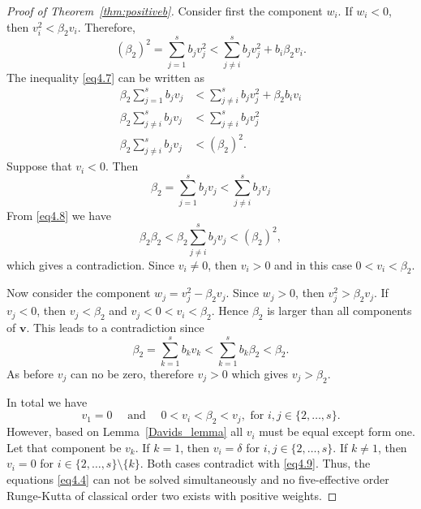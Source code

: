 \begin{proof}[Proof of Theorem~\ref{thm:positiveb}]
    Consider first the component \( w_{i} \). If \( w_{i} < 0 \), then \( v_{i}^{2} < \beta_{2}v_{i} \). Therefore,
    \begin{equation}\label{eq4.7}
        (\beta_{2})^{2} = \sum_{j=1}^{s}b_{j}v_{j}^{2} < \sum_{j \neq i}^{s}b_{j}v_{j}^{2} + b_{i}\beta_{2}v_{i}.
    \end{equation}
    The inequality \eqref{eq4.7} can be written as
    \begin{equation}\label{eq4.8}
        \begin{split}
            \beta_{2}\sum_{j=1}^{s}b_{j}v_{j} &< \sum_{j \neq i}^{s}b_{j}v_{j}^{2} + \beta_{2}b_{i}v_{i} \\
            \beta_{2}\sum_{j \neq i}^{s}b_{j}v_{j} &< \sum_{j \neq i}^{s}b_{j}v_{j}^{2} \\
            \beta_{2}\sum_{j \neq i}^{s}b_{j}v_{j} &< (\beta_{2})^{2}.
        \end{split}
    \end{equation}
    Suppose that \( v_{i} < 0 \). Then
    \begin{equation*}
        \beta_{2} = \sum_{j=1}^{s}b_{j}v_{j} < \sum_{j \neq i}^{s}b_{j}v_{j}
    \end{equation*}
    From \eqref{eq4.8} we have
    \begin{equation*}
            \beta_{2}\beta_{2} < \beta_{2}\sum_{j \neq i}^{s}b_{j}v_{j} < (\beta_{2})^{2},
    \end{equation*}
    which gives a contradiction. Since \( v_{i} \neq 0 \), then \( v_{i} > 0 \) and in this case \( 0 < v_{i} < \beta_{2} \).

    Now consider the component \( w_{j} = v_{j}^{2} - \beta_{2}v_{j} \). Since \( w_{j} > 0 \), then \( v_{j}^{2} > \beta_{2}v_{j} \). If \( v_{j} < 0 \), then \( v_{j} < \beta_{2} \) and \( v_{j} < 0 < v_{i} < \beta_{2} \). Hence \( \beta_{2} \) is larger than all components of \( \bm{v} \). This leads to a contradiction since
    \begin{equation*}
            \beta_{2} = \sum_{k=1}^{s}b_{k}v_{k} < \sum_{k=1}^{s}b_{k}\beta_{2} < \beta_{2}.
    \end{equation*}
    As before \( v_{j} \) can no be zero, therefore \( v_{j} > 0 \) which gives \( v_{j} > \beta_{2} \).

    In total we have
    \begin{equation}\label{eq4.9}
        v_{1} = 0 \quad \text{ and } \quad 0 < v_{i} < \beta_{2} < v_{j}, \text{ for } i,j \in \{2,\dots,s\}.
    \end{equation}
    However, based on Lemma~\ref{Davids_lemma} all \( v_{i} \) must be equal except form one. Let that component be \( v_{k} \). If \( k = 1 \), then \( v_{i} = \delta \) for \( i,j \in \{2,\dots,s\} \). If \( k \neq 1 \), then \( v_{i} = 0 \) for \( i \in \{2,\dots,s\}\setminus\{k\} \). Both cases contradict with \eqref{eq4.9}. Thus, the equations \eqref{eq4.4} can not be solved simultaneously and no five-effective order Runge-Kutta of classical order two exists with positive weights.



\end{proof}
